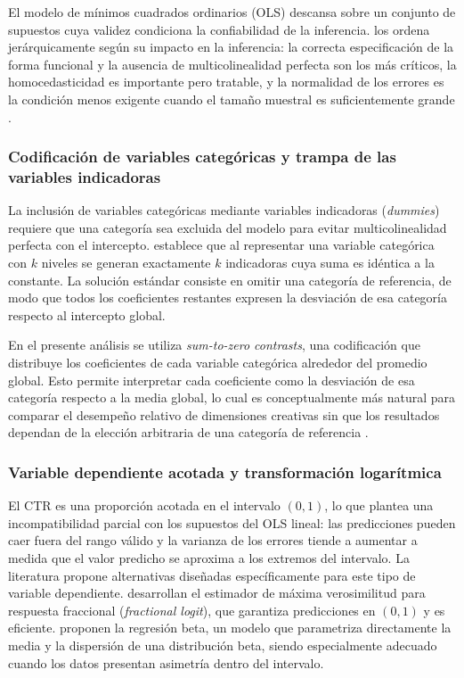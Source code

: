 \documentclass[12pt, a4paper]{report}
\begin{document}
El modelo de mínimos cuadrados ordinarios (OLS) descansa sobre un conjunto de supuestos
cuya validez condiciona la confiabilidad de la inferencia. \citet{fox2016} los ordena
jerárquicamente según su impacto en la inferencia: la correcta especificación de la
forma funcional y la ausencia de multicolinealidad perfecta son los más críticos, la
homocedasticidad es importante pero tratable, y la normalidad de los errores es la condición
menos exigente cuando el tamaño muestral es suficientemente grande
\citep[Cap.~5]{fox2016}.

\subsubsection*{Codificación de variables categóricas y trampa de las variables indicadoras}

La inclusión de variables categóricas mediante variables indicadoras (\textit{dummies})
requiere que una categoría sea excluida del modelo para evitar multicolinealidad perfecta
con el intercepto. 
\citet[p.~163]{fox2016} establece que al representar una variable categórica con $k$
niveles se generan exactamente $k$ indicadoras cuya suma es idéntica a la constante. La solución estándar consiste
en omitir una categoría de referencia, de modo que todos los coeficientes restantes
expresen la desviación de esa categoría respecto al intercepto global.

En el presente análisis se utiliza \textit{sum-to-zero contrasts}, una codificación que
distribuye los coeficientes de cada variable categórica alrededor del promedio global. Esto permite
interpretar cada coeficiente como la desviación de esa categoría respecto a la
media global, lo cual es conceptualmente más natural para comparar el desempeño
relativo de dimensiones creativas sin que los resultados dependan de la elección
arbitraria de una categoría de referencia \citep[Cap.~8]{fox2016}.

\subsubsection*{Variable dependiente acotada y transformación logarítmica}

El CTR es una proporción acotada en el intervalo $(0, 1)$, lo que plantea una
incompatibilidad parcial con los supuestos del OLS lineal: las predicciones pueden
caer fuera del rango válido y la varianza de los errores tiende a aumentar a medida
que el valor predicho se aproxima a los extremos del intervalo. La literatura propone
alternativas diseñadas específicamente para este tipo de variable dependiente.
\citet{papke1996} desarrollan el estimador de máxima verosimilitud para respuesta
fraccional (\textit{fractional logit}), que garantiza predicciones en $(0,1)$ y es eficiente. 
\citet{ferrari2004} proponen la regresión beta, un modelo
que parametriza directamente la media y la dispersión de una distribución beta, siendo
especialmente adecuado cuando los datos presentan asimetría dentro del intervalo.
\end{document}
